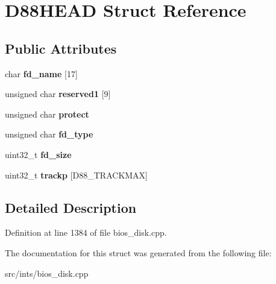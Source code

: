 \hypertarget{structD88HEAD}{\section{D88\-H\-E\-A\-D Struct Reference}
\label{structD88HEAD}
}
\subsection*{Public Attributes}
\begin{DoxyCompactItemize}
\item 
\hypertarget{structD88HEAD_a2c0d333ef195411bba5037f50fd84851}{char {\bfseries fd\-\_\-name} \mbox{[}17\mbox{]}}\label{structD88HEAD_a2c0d333ef195411bba5037f50fd84851}

\item 
\hypertarget{structD88HEAD_a84361ff288bb15c2b0d6f0178ac92307}{unsigned char {\bfseries reserved1} \mbox{[}9\mbox{]}}\label{structD88HEAD_a84361ff288bb15c2b0d6f0178ac92307}

\item 
\hypertarget{structD88HEAD_ae3bd557d9f3ea266a37e5d8e35808169}{unsigned char {\bfseries protect}}\label{structD88HEAD_ae3bd557d9f3ea266a37e5d8e35808169}

\item 
\hypertarget{structD88HEAD_a1d70d36b2a1c7de70b2ea326c60bcbb0}{unsigned char {\bfseries fd\-\_\-type}}\label{structD88HEAD_a1d70d36b2a1c7de70b2ea326c60bcbb0}

\item 
\hypertarget{structD88HEAD_a482cd78a7bd79559ba4982fb5bdadf4e}{uint32\-\_\-t {\bfseries fd\-\_\-size}}\label{structD88HEAD_a482cd78a7bd79559ba4982fb5bdadf4e}

\item 
\hypertarget{structD88HEAD_a7cc91cbeb7f776053cb525dccc7c8abe}{uint32\-\_\-t {\bfseries trackp} \mbox{[}D88\-\_\-\-T\-R\-A\-C\-K\-M\-A\-X\mbox{]}}\label{structD88HEAD_a7cc91cbeb7f776053cb525dccc7c8abe}

\end{DoxyCompactItemize}


\subsection{Detailed Description}


Definition at line 1384 of file bios\-\_\-disk.\-cpp.



The documentation for this struct was generated from the following file\-:\begin{DoxyCompactItemize}
\item 
src/ints/bios\-\_\-disk.\-cpp\end{DoxyCompactItemize}
